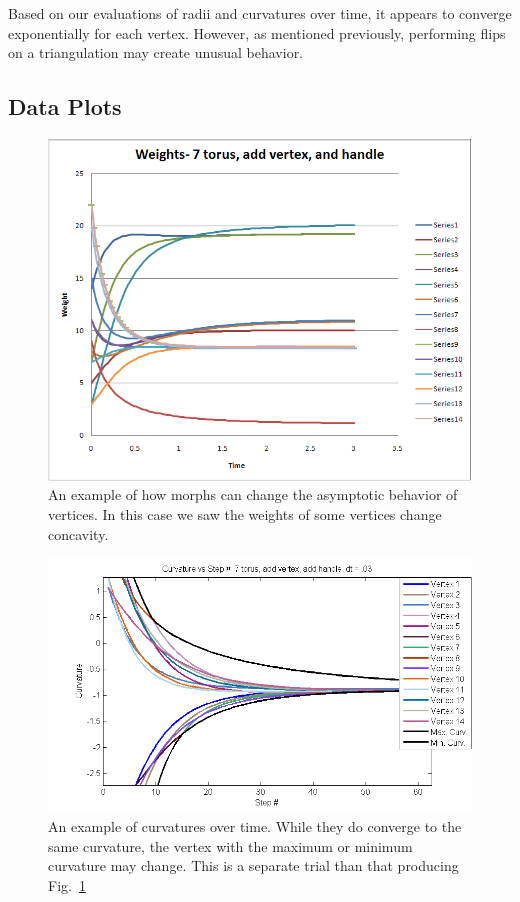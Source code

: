 \documentclass[12pt]{article}
\begin{document}
Based on our evaluations of radii and curvatures over time, it appears to converge exponentially for each vertex. However, as mentioned previously, performing flips on a triangulation may create unusual behavior.

\subsection{Data Plots}
\label{dataplots}

\begin{figure}[ht]
\centering
\includegraphics[scale = 0.65]{Pictures/torus7addvaddhweights2.png}
\caption{An example of how morphs can change the asymptotic behavior of vertices. In this case we saw the weights of some vertices change concavity.}
\label{fig:t7vh}
\end{figure}

\begin{figure}
\centering
\includegraphics[scale = 0.8]{Pictures/curvcurves.png}
\caption{An example of curvatures over time. While they do converge to the same curvature, the vertex with the maximum or minimum curvature may change. This is a separate trial than that producing Fig.~\ref{fig:t7vh}}
\end{figure}
\end{document}
